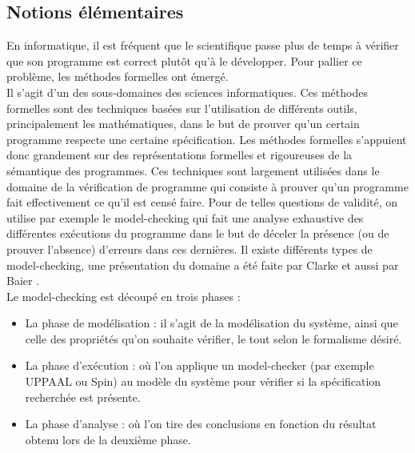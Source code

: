 \documentclass[12pt,a4paper,oneside]{book}
\theoremstyle{break}
\theoremstyle{breakplain}
\begin{document}
\subsection{Notions élémentaires}
En informatique, il est fréquent que le scientifique passe plus de temps à vérifier que son programme est correct plutôt qu'à le développer. Pour pallier ce problème, les méthodes formelles ont émergé.\\
Il s'agit d'un des sous-domaines des sciences informatiques. Ces méthodes formelles sont des techniques basées sur l'utilisation de différents outils, principalement les mathématiques, dans le but de prouver qu'un certain programme respecte une certaine spécification. Les méthodes formelles s'appuient donc grandement sur des représentations formelles et rigoureuses de la sémantique des programmes. Ces techniques sont largement utilisées dans le domaine de la vérification de programme qui consiste à prouver qu'un programme fait effectivement ce qu'il est censé faire. Pour de telles questions de validité, on utilise par exemple le model-checking qui fait une analyse exhaustive des différentes exécutions du programme dans le but de déceler la présence (ou de prouver l'absence) d'erreurs dans ces dernières. Il existe différents types de model-checking, une présentation du domaine a été faite par Clarke \cite{clarke1999model} et aussi par Baier \cite{baier2008principles}.\\

Le model-checking est découpé en trois phases :
\begin{itemize}
\item La phase de modélisation : il s'agit de la modélisation du système, ainsi que celle des propriétés qu'on souhaite vérifier, le tout selon le formalisme désiré.
\item La phase d'exécution : où l'on applique un model-checker (par exemple UPPAAL ou Spin) au modèle du système pour vérifier si la spécification recherchée est présente.
\item La phase d'analyse : où l'on tire des conclusions en fonction du résultat obtenu lors de la deuxième phase.
\end{itemize}
\phantom\\
\end{document}
